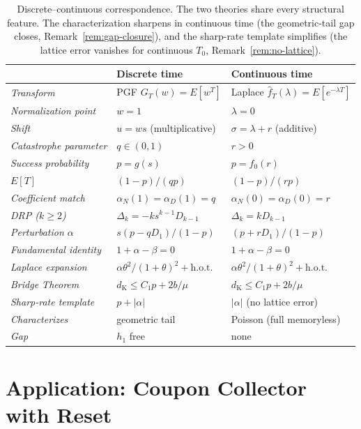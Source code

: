 \documentclass[11pt]{article}
\theoremstyle{plain}
\theoremstyle{definition}
\theoremstyle{remark}
\newcommand{\dK}{d_{\mathrm{K}}}
\begin{document}
\begin{table}[ht]
\centering
\small
\renewcommand{\arraystretch}{1.25}
\begin{tabular}{lll}
\toprule
& \textbf{Discrete time} & \textbf{Continuous time} \\
\midrule
\emph{Transform} & PGF $G_T(w) = E[w^T]$ & Laplace $\hat{f}_T(\lambda) = E[e^{-\lambda T}]$ \\
\emph{Normalization point} & $w = 1$ & $\lambda = 0$ \\
\emph{Shift} & $u = ws$ (multiplicative) & $\sigma = \lambda + r$ (additive) \\
\emph{Catastrophe parameter} & $q \in (0,1)$ & $r > 0$ \\
\emph{Success probability} & $p = g(s)$ & $p = \hat{f}_0(r)$ \\
\emph{$E[T]$} & $(1-p)/(qp)$ & $(1-p)/(rp)$ \\
\emph{Coefficient match} & $\alpha_N(1) = \alpha_D(1) = q$ & $\alpha_N(0) = \alpha_D(0) = r$ \\
\emph{DRP ($k \geq 2$)} & $\Delta_k = -ks^{k-1}D_{k-1}$ & $\Delta_k = kD_{k-1}$ \\
\emph{Perturbation $\alpha$} & $s(p-qD_1)/(1-p)$ & $(p+rD_1)/(1-p)$ \\
\emph{Fundamental identity} & $1 + \alpha - \beta = 0$ & $1 + \alpha - \beta = 0$ \\
\emph{Laplace expansion} & $\alpha\theta^2/(1+\theta)^2 + \text{h.o.t.}$ & $\alpha\theta^2/(1+\theta)^2 + \text{h.o.t.}$ \\
\emph{Bridge Theorem} & $\dK \leq C_1 p + 2b/\mu$ & $\dK \leq C_1 p + 2b/\mu$ \\
\emph{Sharp-rate template} & $p + |\alpha|$ & $|\alpha|$ (no lattice error) \\
\emph{Characterizes} & geometric tail & Poisson (full memoryless) \\
\emph{Gap} & $h_1$ free & none \\
\bottomrule
\end{tabular}
\caption{Discrete--continuous correspondence.  The two theories share every structural feature.  The characterization sharpens in continuous time (the geometric-tail gap closes, Remark~\ref{rem:gap-closure}), and the sharp-rate template simplifies (the lattice error vanishes for continuous $T_0$, Remark~\ref{rem:no-lattice}).}\label{tab:correspondence}
\end{table}




\section{Application: Coupon Collector with Reset}\label{sec:ccp-app}
\end{document}
